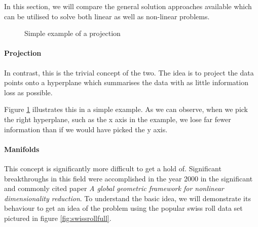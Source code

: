 
In this section, we will compare the general solution approaches available which can be utilised to solve both linear as well as non-linear problems. \cite{HandsOnMLCh8}


\renewcommand{\tikzscale}{0.33}
\begin{figure}
	\vspace*{-8mm}
	\centering
	
	\captionsetup{justification=centering}
	\caption{Simple example of a projection}
    \label{fig:projectionExample}
\end{figure}

\paragraph{Projection} In contrast, this is the trivial concept of the two. The idea is to project the data points onto a \gls{hyperplane} which summarises the data with as little information loss as possible.

Figure \ref{fig:projectionExample} illustrates this in a simple example.
As we can observe, when we pick the right \gls{hyperplane}, such as the x axis in the example, we lose far fewer information than if we would have picked the y axis.


\paragraph{Manifolds} This concept is significantly more difficult to get a hold of.
Significant breakthroughs \cite{ma2012manifold} in this field were accomplished in the year 2000 in the significant and commonly cited paper \emph{A global geometric framework for nonlinear dimensionality reduction}. \cite{tenenbaum2000global}
To understand the basic idea, we will demonstrate its behaviour to get an idea of the problem using the popular swiss roll data set pictured in figure \ref{fig:swissrollfull}.


